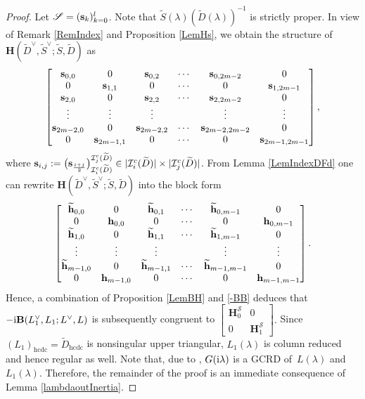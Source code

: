 \documentclass[12pt,reqno]{amsart}
\theoremstyle{plain}
\numberwithin{equation}{section}
\theoremstyle{remark}
\def\wtilde{\widetilde} \def\what{\widehat}
\begin{document}
\begin{proof}
 
Let $\mathscr S=({\bf s}_k)_{k=0}^{l}$. Note that $\wtilde S(\lambda)(\wtilde D(\lambda))^{-1}$ is strictly proper. 
In view of Remark \ref{RemIndex} and Proposition \ref{LemHs}, we obtain  the structure of $\mathbf{H}(\wtilde D^{\vee},\wtilde S^{\vee};\wtilde S,\wtilde D)$ as
\begin{equation*}
  \begin{bmatrix} {\bf s}_{0,0} & 0 & {\bf s}_{0,2} & \cdots & {\bf s}_{0,2m-2} & 0 \\
        0 &  {\bf s}_{1,1} & 0 & \cdots &0 & {\bf s}_{1,2m-1}  \\
        {\bf s}_{2,0} & 0 & {\bf s}_{2,2} & \cdots & {\bf s}_{2,2m-2} & 0\\
        \vdots & \vdots & \vdots && \vdots & \vdots\\
        {\bf s}_{2m-2,0} & 0 & {\bf s}_{2m-2,2} & \cdots & {\bf s}_{2m-2,2m-2} & 0\\
        0 &  {\bf s}_{2m-1,1} & 0 & \cdots & 0 &  {\bf s}_{2m-1,2m-1}
\end{bmatrix},
\end{equation*}
where ${\bf s}_{i,j}:=\big({\bf s}_{\frac{i+j}{2}}\big)_{\mathcal I^c_i(\wtilde D)}^{\mathcal I^c_j(\wtilde D)}\in |\mathcal I^c_i(\wtilde D)|\times |\mathcal I^c_j(\wtilde D)|$.
From Lemma \ref{LemIndexDFd} one can rewrite $\mathbf{H}(\wtilde D^{\vee},\wtilde S^{\vee};\wtilde S,\wtilde D)$ into the block form
\begin{equation*}
  \begin{bmatrix} \wtilde {\bf h}_{0,0} & 0 & \wtilde {\bf h}_{0,1} & \cdots & \wtilde {\bf h}_{0,m-1} & 0 \\
       0  &  {\bf h}_{0,0} & 0 & \cdots & 0 & {\bf h}_{0,m-1} \\
        \wtilde {\bf h}_{1,0} & 0 & \wtilde {\bf h}_{1,1} & \cdots & \wtilde {\bf h}_{1,m-1} & 0\\
        \vdots & \vdots & \vdots && \vdots & \vdots\\
        \wtilde {\bf h}_{m-1,0} & 0& \wtilde {\bf h}_{m-1,1} & \cdots & \wtilde {\bf h}_{m-1,m-1} & 0\\
        0 &  {\bf h}_{m-1,0} & 0 & \cdots & 0 & {\bf h}_{m-1,m-1}
\end{bmatrix}.
\end{equation*}
Hence, a combination of  Proposition \ref{LemBH} and \eqref{-BB} deduces that  $-{\rm i}{\bf B}(L_1^{\vee},L_1;L^{\vee},L)$ is subsequently congruent to
$
 \begin{bmatrix}
 \mathbf{H}_{0}^{\mathscr S} & 0\\
0 & \mathbf{H}_{1}^{\mathscr S}
 \end{bmatrix}.
$
Since 
$(L_1)_{\mathrm{hcdc}}=\wtilde D_{\mathrm{hcdc}}$ is nonsingular upper triangular,
 $L_1(\lambda)$ is column reduced and hence regular as well. Note that, due to \cite[Propositions~A.3--A.5]{XD}, $G({\rm i}\lambda)$ is a GCRD of~$L(\lambda)$ and~$L_1(\lambda)$. Therefore, the remainder of the proof is an immediate consequence of Lemma \ref{lambdaoutInertia}.

\end{proof}
\end{document}
